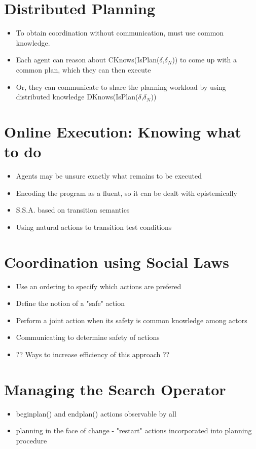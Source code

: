 \section{Distributed Planning}
\begin{itemize}
\item To obtain coordination without communication, must use common knowledge.
\item Each agent can reason about CKnows(IsPlan($\delta$,$\delta_N$)) to come up with a common plan, which they can then execute
\item Or, they can communicate to share the planning workload by using distributed knowledge DKnows(IsPlan($\delta$,$\delta_N$))
\end{itemize}

\section{Online Execution: Knowing what to do}
\begin{itemize}
\item Agents may be unsure exactly what remains to be executed
\item Encoding the program as a fluent, so it can be dealt with epistemically
\item S.S.A. based on transition semantics
\item Using natural actions to transition test conditions
\end{itemize}

\section{Coordination using Social Laws}
\begin{itemize}
\item Use an ordering to specify which actions are prefered
\item Define the notion of a "safe" action
\item Perform a joint action when its safety is common knowledge among actors
\item Communicating to determine safety of actions
\item ?? Ways to increase efficiency of this approach ??
\end{itemize}

\section{Managing the Search Operator}
\begin{itemize}
\item beginplan() and endplan() actions observable by all
\item planning in the face of change - "restart" actions incorporated into planning procedure
\end{itemize}

